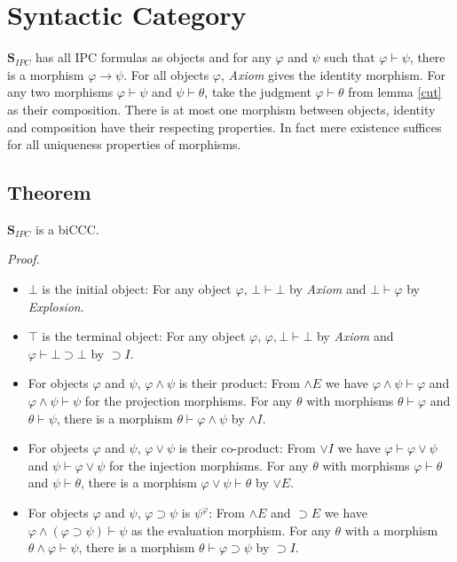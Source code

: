 \documentclass[a4paper,12pt]{paper}
\begin{document}
\section{Syntactic Category} $\mathbf{S}_{IPC}$ has all IPC formulas as objects and for any $\varphi$ and $\psi$ such that $\varphi \vdash \psi$, there is a morphism $\varphi \longrightarrow \psi$.
For all objects $\varphi$, \textit{Axiom} gives the identity morphism. For any two morphisms $\varphi \vdash \psi$ and $\psi \vdash \theta$, take the judgment $\varphi \vdash \theta$ from lemma \ref{cut} as their composition. There is at most one morphism between objects, identity and composition have their respecting properties. In fact mere existence suffices for all uniqueness properties of morphisms.

\subsection{Theorem}\label{S_is_ccc} $\mathbf{S}_{IPC}$ is a biCCC.

\textit{Proof.}
\begin{itemize}
\item $\bot$ is the initial object: For any object $\varphi$, $\bot \vdash \bot$ by \textit{Axiom} and $\bot \vdash \varphi$ by \textit{Explosion}. \\
\item $\top$ is the terminal object: For any object $\varphi$, $\varphi,\bot \vdash \bot$ by \textit{Axiom} and $\varphi \vdash \bot \supset \bot$ by $\supset I$. \\
\item For objects $\varphi$ and $\psi$, $\varphi \land \psi$ is their product: From $\land E$ we have $\varphi \land \psi \vdash \varphi$ and $\varphi \land \psi \vdash \psi$ for the projection morphisms. For any $\theta$ with morphisms $\theta \vdash \varphi$ and $\theta \vdash \psi$, there is a morphism $\theta \vdash \varphi \land \psi$ by $\land I$. \\
\item For objects $\varphi$ and $\psi$, $\varphi \lor \psi$ is their co-product: From $\lor I$ we have $\varphi \vdash \varphi \lor \psi$ and $\psi \vdash \varphi \lor \psi$ for the injection morphisms. For any $\theta$ with morphisms $\varphi \vdash \theta$ and $\psi \vdash \theta$, there is a morphism $\varphi \lor \psi \vdash \theta$ by $\lor E$. \\
\item For objects $\varphi$ and $\psi$, $\varphi \supset \psi$ is $\psi^\varphi$: From $\land E$ and $\supset E$ we have $\varphi \land (\varphi \supset \psi) \vdash \psi$ as the evaluation morphism. For any $\theta$ with a morphism $\theta \land \varphi \vdash \psi$, there is a morphism $\theta \vdash \varphi \supset \psi$ by $\supset I$.
\end{itemize}
\end{document}

